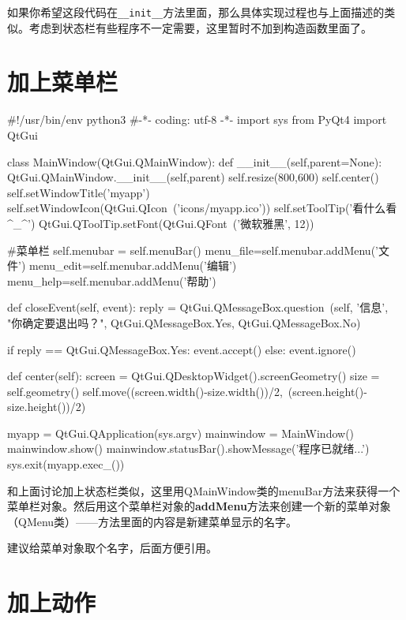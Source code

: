 \documentclass[12pt,oneside]{book}
\begin{document}
\begin{common-format}
如果你希望这段代码在\verb+__init__+方法里面，那么具体实现过程也与上面描述的类似。考虑到状态栏有些程序不一定需要，这里暂时不加到构造函数里面了。


\section{加上菜单栏}

\begin{tcbpython}[]
#!/usr/bin/env python3
#-*- coding: utf-8 -*-
import sys
from PyQt4  import QtGui

class MainWindow(QtGui.QMainWindow):
    def __init__(self,parent=None):
        QtGui.QMainWindow.__init__(self,parent)
        self.resize(800,600)
        self.center()
        self.setWindowTitle('myapp')
        self.setWindowIcon(QtGui.QIcon\
        ('icons/myapp.ico'))
        self.setToolTip('看什么看^_^')
        QtGui.QToolTip.setFont(QtGui.QFont\
        ('微软雅黑', 12))

    #菜单栏
        self.menubar = self.menuBar()
        menu_file=self.menubar.addMenu('文件')
        menu_edit=self.menubar.addMenu('编辑')
        menu_help=self.menubar.addMenu('帮助')

    def closeEvent(self, event):
        reply = QtGui.QMessageBox.question\
        (self, '信息',
            "你确定要退出吗？",
             QtGui.QMessageBox.Yes,
             QtGui.QMessageBox.No)

        if reply == QtGui.QMessageBox.Yes:
            event.accept()
        else:
            event.ignore()

    def center(self):
        screen = QtGui.QDesktopWidget().screenGeometry()
        size =  self.geometry()
        self.move((screen.width()-size.width())/2,\
         (screen.height()-size.height())/2)

myapp = QtGui.QApplication(sys.argv)
mainwindow = MainWindow()
mainwindow.show()
mainwindow.statusBar().showMessage('程序已就绪...')
sys.exit(myapp.exec_())
\end{tcbpython}

和上面讨论加上状态栏类似，这里用QMainWindow类的menuBar方法来获得一个菜单栏对象。然后用这个菜单栏对象的\textbf{addMenu}方法来创建一个新的菜单对象（QMenu类）——方法里面的内容是新建菜单显示的名字。

建议给菜单对象取个名字，后面方便引用。



\section{加上动作}


\end{common-format}
\end{document}
